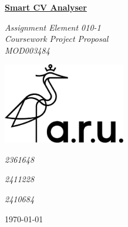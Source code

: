 {
\centering

\vspace*{2.5cm} %
{\huge \underline{\textbf{Smart CV Analyser}} \par}

\vspace{0.5cm}
{\Large \textit{Assignment Element 010-1 \\ Coursework Project Proposal \\ MOD003484} \par}
\vspace{0.5cm}

\vfill %

\includegraphics[width=0.4\textwidth]{img/ARULogo.pdf} %

\vspace{0.5cm}

{\Large \textit{2361648} \par \Large \textit{2411228} \par \Large \textit{2410684} \par} 

\vspace{0.5cm}

{\large \today}


}

